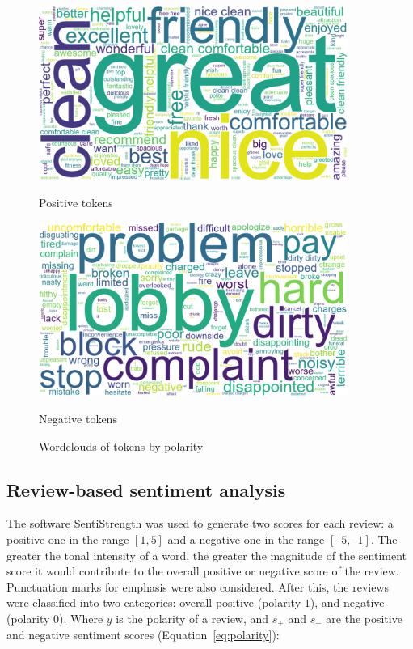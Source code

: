 \documentclass[11pt, a4paper]{pancake-article}
\begin{document}
\begin{figure}[htpb]
	\centering
	\begin{minipage}{0.5\textwidth}
		\centering
		\includegraphics[width=0.9\textwidth]{../results/old/wordcloud_1.png}
		\caption*{Positive tokens}
	\end{minipage}\hfill
	\begin{minipage}{0.5\textwidth}
		\centering
		\includegraphics[width=0.9\textwidth]{../results/old/wordcloud_0.png}
		\caption*{Negative tokens}
	\end{minipage}
	\caption{Wordclouds of tokens by polarity}
	\label{fig:wordclouds}
\end{figure}

\subsection{Review-based sentiment analysis}\label{sec:reviews}

The software SentiStrength was used to generate two scores for each review:
a positive one in the range \(\left[1, 5\right]\) and a negative one in the range \(\left[–5, –1\right]\).
The greater the tonal intensity of a word, the greater the magnitude of the sentiment score
it would contribute to the overall positive or negative score of the review. Punctuation marks for
emphasis were also considered. After this, the reviews were classified into two categories: overall
positive (polarity \(1\)), and negative (polarity \(0\)). Where \(y\) is the polarity
of a review, and \(s_+\) and \(s_-\) are the positive and negative sentiment scores (Equation~\ref{eq:polarity}):
\end{document}

